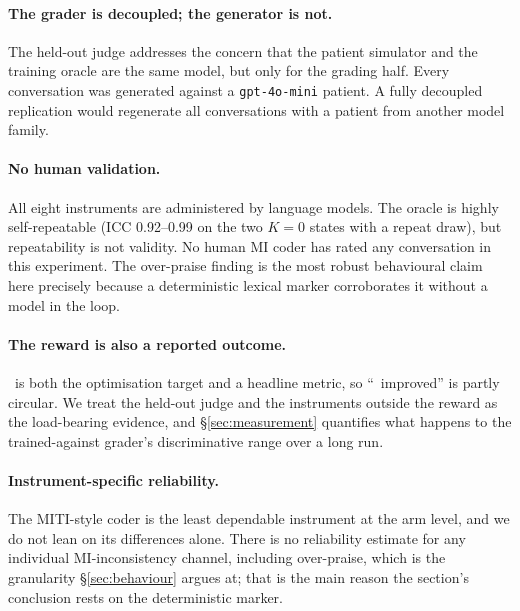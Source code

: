 \paragraph{The grader is decoupled; the generator is not.}
The held-out judge addresses the concern that the patient simulator and the training oracle are the
same model, but only for the grading half. Every conversation was generated against a
\texttt{gpt-4o-mini} patient. A fully decoupled replication would regenerate all conversations with
a patient from another model family.

\paragraph{No human validation.}
All eight instruments are administered by language models. The oracle is highly self-repeatable
(ICC 0.92--0.99 on the two $K{=}0$ states with a repeat draw), but repeatability is not validity. No human MI
coder has rated any conversation in this experiment. The over-praise finding is the most robust
behavioural claim here precisely because a deterministic lexical marker corroborates it without a
model in the loop.

\paragraph{The reward is also a reported outcome.}
\QQ\ is both the optimisation target and a headline metric, so ``\QQ\ improved'' is partly
circular. We treat the held-out judge and the instruments outside the reward as the load-bearing
evidence, and \S\ref{sec:measurement} quantifies what happens to the trained-against grader's
discriminative range over a long run.

\paragraph{Instrument-specific reliability.}
The MITI-style coder is the least dependable instrument at the arm level, and we do not lean on
its differences alone. There is no reliability estimate for any individual MI-inconsistency
channel, including over-praise, which is the granularity \S\ref{sec:behaviour} argues at; that is
the main reason the section's conclusion rests on the deterministic marker.
